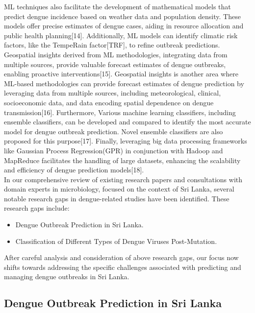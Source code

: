 \documentclass[conference]{IEEEtran}
\begin{document}
ML techniques also facilitate the development of mathematical models that predict dengue incidence
based on weather data and population density. These models offer precise estimates of dengue
cases, aiding in resource allocation and public health planning[14].
Additionally, ML models can identify climatic risk factors, like the TempeRain factor[TRF],
to refine outbreak predictions. Geospatial insights derived from ML methodologies,
integrating data from multiple sources, provide valuable forecast estimates
of dengue outbreaks, enabling proactive interventions[15]. Geospatial insights is another
area where ML-based methodologies can provide forecast estimates of dengue prediction by
leveraging data from multiple sources, including meteorological, clinical, socioeconomic data,
and data encoding spatial dependence on dengue transmission[16]. Furthermore, Various machine
learning classifiers, including ensemble classifiers, can be developed and compared to
identify the most accurate model for dengue outbreak prediction. Novel ensemble
classifiers are also proposed for this purpose[17]. Finally, leveraging big data processing
frameworks like Gaussian Process Regression(GPR) in conjunction with Hadoop and MapReduce
facilitates the handling of large datasets, enhancing the scalability and efficiency of dengue
prediction models[18]. \\

In our comprehensive review of existing research papers and consultations with domain experts
in microbiology, focused on the context of Sri Lanka, several notable research gaps in
dengue-related studies have been identified. These research gaps include:

\begin{itemize}
    \item Dengue Outbreak Prediction in Sri Lanka.
    \item Classification of Different Types of Dengue Viruses Post-Mutation.
\end{itemize}

After careful analysis and consideration of above research gaps, our focus now
shifts towards addressing the specific challenges associated with predicting and
managing dengue outbreaks in Sri Lanka. \\

\subsection{Dengue Outbreak Prediction in Sri Lanka}
\end{document}
